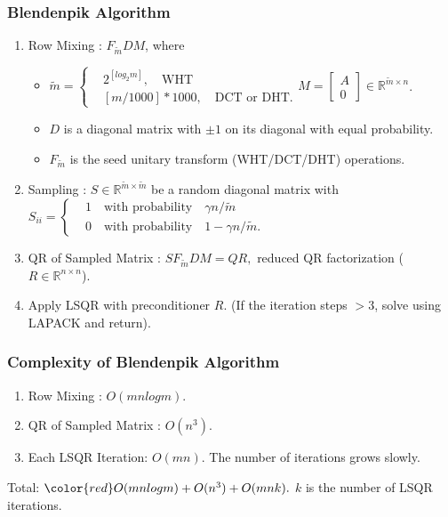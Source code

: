 \subsubsection{Blendenpik Algorithm}
\begin{tcolorbox}
\begin{enumerate}
\item Row Mixing : $F_{\tilde{m}} DM$, where
\begin{itemize}
\item $\tilde{m} = \begin{cases}& 2^{[log_2 m]} , \quad \text{WHT} \\
                                         & [m/1000]*1000, \quad \text{DCT or DHT}.
                    \end{cases}$\quad  $M = \begin{bmatrix} A\\ 0 \end{bmatrix} \in \mathbb{R}^{\tilde{m} \times n}$. \\
\item $D$ is a diagonal matrix with $\pm 1$ on its diagonal with equal probability. \\
\item $F_{\tilde{m}}$ is the seed unitary transform (WHT/DCT/DHT) operations.
\end{itemize}
\item Sampling : $S \in \mathbb{R}^{\tilde{m} \times \tilde{m}}$ be a random diagonal matrix with
$S_{ii} = \begin{cases} & 1 \quad \text{with probability}\quad \gamma n /\tilde{m} \\
                                   & 0 \quad \text{with probability}\quad 1 - \gamma n /\tilde{m}.
             \end{cases}$\\
\item QR of Sampled Matrix : $S F_{\tilde{m}} D M = Q R,$  reduced QR factorization ($R\in \mathbb{R}^{n \times n} $). \\
\item Apply LSQR with preconditioner $R$. (If the iteration steps $>3$, solve using LAPACK and return).
\end{enumerate}
\end{tcolorbox}

\subsubsection{Complexity of Blendenpik Algorithm}
\begin{tcolorbox}
\begin{enumerate}
\item Row Mixing : $O(mn log m).$ \\
\item QR of Sampled Matrix : $O(n^3).$\\
\item Each LSQR Iteration: $O(mn).$ The number of iterations grows slowly.
\end{enumerate}
Total: ${\color{red} O(mn log m) + O(n^3) + O(mn k)}.$ $k$ is the number of LSQR iterations.
\end{tcolorbox}

